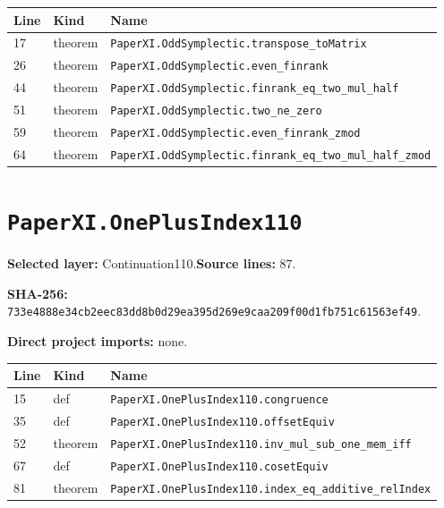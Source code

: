 \documentclass[10pt,oneside]{book}
\begin{document}
\begin{longtable}{@{}p{}p{}p{}@{}}\toprule Line&Kind&Name\\\midrule\endhead

17&theorem&\nolinkurl{PaperXI.OddSymplectic.transpose_toMatrix}\\

26&theorem&\nolinkurl{PaperXI.OddSymplectic.even_finrank}\\

44&theorem&\nolinkurl{PaperXI.OddSymplectic.finrank_eq_two_mul_half}\\

51&theorem&\nolinkurl{PaperXI.OddSymplectic.two_ne_zero}\\

59&theorem&\nolinkurl{PaperXI.OddSymplectic.even_finrank_zmod}\\

64&theorem&\nolinkurl{PaperXI.OddSymplectic.finrank_eq_two_mul_half_zmod}\\

\bottomrule\end{longtable}

\section{\texorpdfstring{\nolinkurl{PaperXI.OnePlusIndex110}}{PaperXI.OnePlusIndex110}}\label{module:PaperXI.OnePlusIndex110}

\textbf{Selected layer:} Continuation110.\quad\textbf{Source lines:} 87.\par\textbf{SHA-256:} {\scriptsize\nolinkurl{733e4888e34cb2eec83dd8b0d29ea395d269e9caa209f00d1fb751c61563ef49}}.


\textbf{Direct project imports:} none.

\begin{longtable}{@{}p{}p{}p{}@{}}\toprule Line&Kind&Name\\\midrule\endhead

15&def&\nolinkurl{PaperXI.OnePlusIndex110.congruence}\\

35&def&\nolinkurl{PaperXI.OnePlusIndex110.offsetEquiv}\\

52&theorem&\nolinkurl{PaperXI.OnePlusIndex110.inv_mul_sub_one_mem_iff}\\

67&def&\nolinkurl{PaperXI.OnePlusIndex110.cosetEquiv}\\

81&theorem&\nolinkurl{PaperXI.OnePlusIndex110.index_eq_additive_relIndex}\\

\bottomrule\end{longtable}
\end{document}

